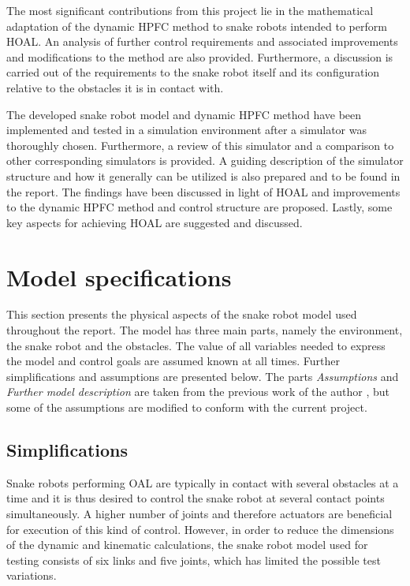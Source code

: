 The most significant contributions from this project lie in the mathematical adaptation of the dynamic HPFC method to snake robots intended to perform HOAL. An analysis of further control requirements and associated improvements and modifications to the method are also provided. Furthermore, a discussion is carried out of the requirements to the snake robot itself and its configuration relative to the obstacles it is in contact with.

The developed snake robot model and dynamic HPFC method have been implemented and tested in a simulation environment after a simulator was thoroughly chosen. Furthermore, a review of this simulator and a comparison to other corresponding simulators is provided. A guiding description of the simulator structure and how it generally can be utilized is also prepared and to be found in the report. The findings have been discussed in light of HOAL and improvements to the dynamic HPFC method and control structure are proposed. Lastly, some key aspects for achieving HOAL are suggested and discussed.


\section{Model specifications} \label{ch:model_specs}

This section presents the physical aspects of the snake robot model used throughout the report. The model has three main parts, namely the environment, the snake robot and the obstacles. The value of all variables needed to express the model and control goals are assumed known at all times. Further simplifications and assumptions are presented below. The parts \textit{Assumptions} and \textit{Further model description} are taken from the previous work of the author \cite{AtussaProsjektoppgp}, but some of the assumptions are modified to conform with the current project.

\subsection{Simplifications}

Snake robots performing OAL are typically in contact with several obstacles at a time and it is thus desired to control the snake robot at several contact points simultaneously. A higher number of joints and therefore actuators are beneficial for execution of this kind of control. However, in order to reduce the dimensions of the dynamic and kinematic calculations, the snake robot model used for testing consists of six links and five joints, which has limited the possible test variations.

